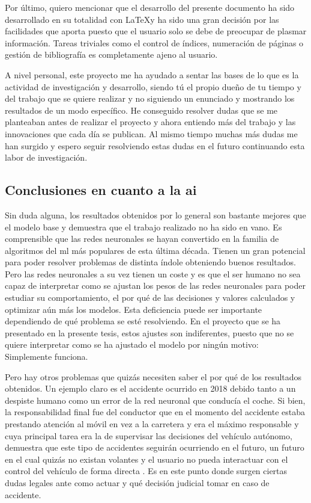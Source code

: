 Por último, quiero mencionar que el desarrollo del presente documento ha sido desarrollado en su totalidad con \LaTeX y ha sido una gran decisión por las facilidades que aporta puesto que el usuario solo se debe de preocupar de plasmar información. Tareas triviales como el control de índices, numeración de páginas o gestión de bibliografía es completamente ajeno al usuario.
\newline

A nivel personal, este proyecto me ha ayudado a sentar las bases de lo que es la actividad de investigación y desarrollo, siendo tú el propio dueño de tu tiempo y del trabajo que se quiere realizar y no siguiendo un enunciado y mostrando los resultados de un modo específico. He conseguido resolver dudas que se me planteaban antes de realizar el proyecto y ahora entiendo más del trabajo y las innovaciones que cada día se publican. Al mismo tiempo muchas más dudas me han surgido y espero seguir resolviendo estas dudas en el futuro continuando esta labor de investigación.
\newline

\subsection{Conclusiones en cuanto a la \acrshort{ai}}

Sin duda alguna, los resultados obtenidos por lo general son bastante mejores que el modelo base y demuestra que el trabajo realizado no ha sido en vano. Es comprensible que las redes neuronales se hayan convertido en la familia de algoritmos del \acrlong{ml} más populares de esta última década. Tienen un gran potencial para poder resolver problemas de distinta índole obteniendo buenos resultados. Pero las redes neuronales a su vez tienen un coste y es que el ser humano no sea capaz de interpretar como se ajustan los pesos de las redes neuronales para poder estudiar su comportamiento, el por qué de las decisiones y valores calculados y optimizar aún más los modelos. Esta deficiencia puede ser importante dependiendo de qué problema se esté resolviendo. En el proyecto que se ha presentado en la presente tesis, estos ajustes son indiferentes, puesto que no se quiere interpretar como se ha ajustado el modelo por ningún motivo: Simplemente funciona.
\newline

Pero hay otros problemas que quizás necesiten saber el por qué de los resultados obtenidos. Un ejemplo claro es el accidente ocurrido en 2018 \cite{uber} debido tanto a un despiste humano como un error de la red neuronal que conducía el coche. Si bien, la responsabilidad final fue del conductor que en el momento del accidente estaba prestando atención al móvil en vez a la carretera y era el máximo responsable y cuya principal tarea era la de supervisar las decisiones del vehículo autónomo, demuestra que este tipo de accidentes seguirán ocurriendo en el futuro, un futuro en el cual quizás no existan volantes y el usuario no pueda interactuar con el control del vehículo de forma directa \cite{nowheel}. Es en este punto donde surgen ciertas dudas legales ante como actuar y qué decisión judicial tomar en caso de accidente.
\newline

